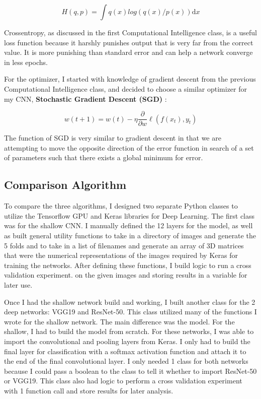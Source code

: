 \documentclass[12pt]{article}
\begin{document}
\[
		H(q,p) =  \int q(x) log(q(x) / p(x)) \mathrm{d}x
\]

Crossentropy, as discussed in the first Computational Intelligence class, is a useful loss function because it harshly punishes output that is very far from the correct value. It is more punishing than standard error and can help a network converge in less epochs. 

For the optimizer, I started with knowledge of gradient descent from the previous Computational Intelligence class, and decided to choose a similar optimizer for my CNN, \textbf{Stochastic Gradient Descent (SGD)} \cite{sgd}:

\[
	w(t+1) = w(t) - \eta \frac{\partial}{\partial w} \ell(f(x_t), y_t)
\]

The function of SGD is very similar to gradient descent in that we are attempting to move the opposite direction of the error function in search of a set of parameters such that there exists a global minimum for error.

	\subsection{Comparison Algorithm}
	
To compare the three algorithms, I designed two separate Python classes to utilize the Tensorflow GPU and Keras libraries for Deep Learning. The first class was for the shallow CNN. I manually defined the 12 layers for the model, as well as built general utility functions to take in a directory of images and generate the 5 folds and to take in a list of filenames and generate an array of 3D matrices that were the numerical representations of the images required by Keras for training the networks. After defining these functions, I build logic to run a cross validation experiment. on the given images and storing results in a variable for later use.

Once I had the shallow network build and working, I built another class for the 2 deep networks: VGG19 and ResNet-50. This class utilized many of the functions I wrote for the shallow network. The main difference was the model. For the shallow, I had to build the model from scratch. For these networks, I was able to import the convolutional and pooling layers from Keras. I only had to build the final layer for classification with a softmax activation function and attach it to the end of the final convolutional layer. I only needed 1 class for both networks because I could pass a boolean to the class to tell it whether to import ResNet-50 or VGG19. This class also had logic to perform a cross validation experiment with 1 function call and store results for later analysis. 
\end{document}
